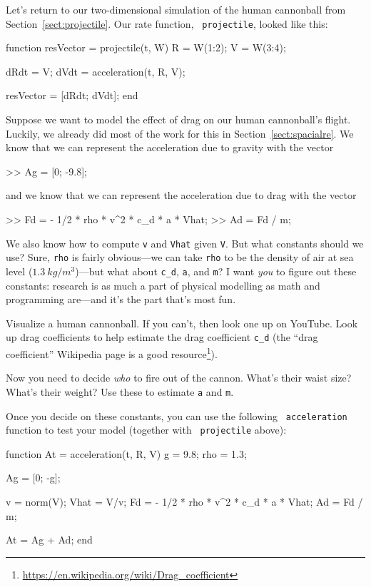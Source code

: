 \documentclass[
]{book}
\numberwithin{Answer}{chapter}
\numberwithin{Exercise}{chapter}
\begin{document}
Let's return to our two-dimensional simulation of the human cannonball
from Section~\ref{sect:projectile}. Our rate function, {\tt
projectile}, looked like this:

\begin{code}
function resVector = projectile(t, W)
    R = W(1:2);
    V = W(3:4);

    dRdt = V;
    dVdt = acceleration(t, R, V);

    resVector = [dRdt; dVdt];
end
\end{code}

Suppose we want to model the effect of drag on our human cannonball's
flight. Luckily, we already did most of the work for this in
Section~\ref{sect:spacialre}. We know that we can represent the acceleration
due to gravity with the vector

\begin{code}
>> Ag = [0; -9.8];
\end{code}

and we know that we can represent the acceleration due to drag with the
vector

\begin{code}
>> Fd = - 1/2 * rho * v^2 * c_d * a * Vhat;
>> Ad = Fd / m;
\end{code}

We also know how to compute {\tt v} and {\tt Vhat} given {\tt V}. But
what constants should we use? Sure, {\tt rho} is fairly obvious---we can
take {\tt rho} to be the density of air at sea level ($1.3 ~
kg/m^3$)---but what about {\tt c\_d}, {\tt a}, and {\tt m}? I want
\textit{you} to figure out these constants: research is as much a part
of physical modelling as math and programming are---and it's the part
that's most fun.

Visualize a human cannonball. If you can't, then look one up on
YouTube. Look up drag coefficients to help estimate the drag
coefficient {\tt c\_d} (the ``drag coefficient'' Wikipedia page is a good
resource\footnote{\url{https://en.wikipedia.org/wiki/Drag_coefficient}}).

Now you need to decide \textit{who} to fire out of the cannon. What's
their waist size? What's their weight? Use these to estimate {\tt a} and
{\tt m}.

Once you decide on these constants, you can use the following {\tt
acceleration} function to test your model (together with {\tt
projectile} above):

\begin{code}
function At = acceleration(t, R, V)
    g = 9.8;             
    rho = 1.3;           %

    Ag = [0; -g];        %

    v = norm(V);
    Vhat = V/v;
    Fd = - 1/2 * rho * v^2 * c_d * a * Vhat;
    Ad = Fd / m;

    At = Ag + Ad;
end
\end{code}
\end{document}
